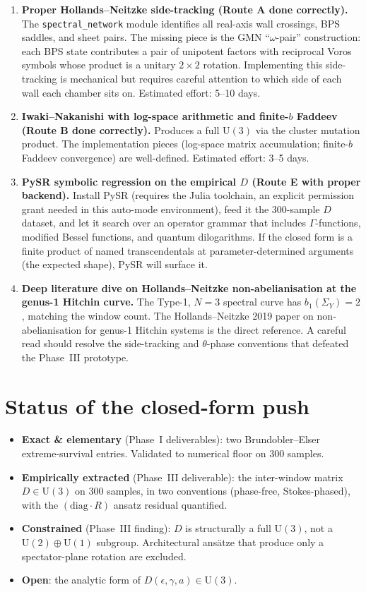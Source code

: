 \documentclass[11pt]{article}
\begin{document}
\begin{enumerate}
 \item \textbf{Proper Hollands--Neitzke side-tracking (Route A
 done correctly).} The \texttt{spectral\_network} module identifies
 all real-axis wall crossings, BPS saddles, and sheet pairs. The
 missing piece is the GMN ``$\omega$-pair'' construction: each BPS
 state contributes a pair of unipotent factors with reciprocal Voros
 symbols whose product is a unitary $2\times 2$ rotation. Implementing
 this side-tracking is mechanical but requires careful attention to
 which side of each wall each chamber sits on. Estimated effort:
 5--10 days.
 \item \textbf{Iwaki--Nakanishi with log-space arithmetic and
 finite-$b$ Faddeev (Route B done correctly).} Produces a
 full $\mathrm U(3)$ via the cluster mutation product. The
 implementation pieces (log-space matrix accumulation; finite-$b$
 Faddeev convergence) are well-defined. Estimated effort: 3--5 days.
 \item \textbf{PySR symbolic regression on the empirical $D$
 (Route E with proper backend).} Install PySR (requires the Julia
 toolchain, an explicit permission grant needed in this auto-mode
 environment), feed it the 300-sample $D$ dataset, and let it search
 over an operator grammar that includes $\Gamma$-functions, modified
 Bessel functions, and quantum dilogarithms. If the closed form is a
 finite product of named transcendentals at parameter-determined
 arguments (the expected shape), PySR will surface it.
 \item \textbf{Deep literature dive on Hollands--Neitzke
 non-abelianisation at the genus-1 Hitchin curve.} The Type-1, $N=3$
 spectral curve has $b_1(\Sigma_Y) = 2$, matching the window count.
 The Hollands--Neitzke 2019 paper on non-abelianisation for
 genus-1 Hitchin systems is the direct reference. A careful read
 should resolve the side-tracking and $\theta$-phase conventions
 that defeated the Phase~III prototype.
\end{enumerate}

\section{Status of the closed-form push}

\begin{itemize}
 \item \textbf{Exact \& elementary} (Phase~I deliverables): two
 Brundobler--Elser extreme-survival entries. Validated to numerical
 floor on 300 samples.
 \item \textbf{Empirically extracted} (Phase~III deliverable): the
 inter-window matrix $D \in \mathrm U(3)$ on 300 samples, in two
 conventions (phase-free, Stokes-phased), with the
 $(\mathrm{diag}\cdot R)$ ansatz residual quantified.
 \item \textbf{Constrained} (Phase~III finding): $D$ is structurally
 a full $\mathrm U(3)$, not a $\mathrm U(2)\oplus\mathrm U(1)$
 subgroup. Architectural ansätze that produce only a spectator-plane
 rotation are excluded.
 \item \textbf{Open}: the analytic form of
 $D(\epsilon, \gamma, a)\in\mathrm U(3)$.
\end{itemize}
\end{document}

